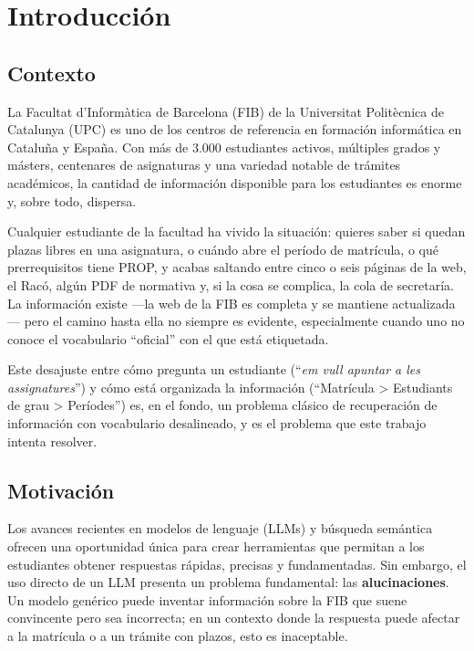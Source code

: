 \documentclass[12pt, a4paper, twoside]{report}
\begin{document}
\cleardoublepage
{}

\chapter{Introducci\'on}
\label{ch:introduccion}

\section{Contexto}

La Facultat d'Inform\`atica de Barcelona (FIB) de la Universitat Polit\`ecnica de Catalunya (UPC) es uno de los centros de referencia en formaci\'on inform\'atica en Catalu\~na y Espa\~na. Con m\'as de 3.000 estudiantes activos, m\'ultiples grados y m\'asters, centenares de asignaturas y una variedad notable de tr\'amites acad\'emicos, la cantidad de informaci\'on disponible para los estudiantes es enorme y, sobre todo, dispersa.

Cualquier estudiante de la facultad ha vivido la situaci\'on: quieres saber si quedan plazas libres en una asignatura, o cu\'ando abre el per\'iodo de matr\'icula, o qu\'e prerrequisitos tiene PROP, y acabas saltando entre cinco o seis p\'aginas de la web, el Rac\'o, alg\'un PDF de normativa y, si la cosa se complica, la cola de secretar\'ia. La informaci\'on existe ---la web de la FIB es completa y se mantiene actualizada--- pero el camino hasta ella no siempre es evidente, especialmente cuando uno no conoce el vocabulario ``oficial'' con el que est\'a etiquetada.

Este desajuste entre c\'omo pregunta un estudiante (``\textit{em vull apuntar a les assignatures}'') y c\'omo est\'a organizada la informaci\'on (``Matr\'icula > Estudiants de grau > Per\'iodes'') es, en el fondo, un problema cl\'asico de recuperaci\'on de informaci\'on con vocabulario desalineado, y es el problema que este trabajo intenta resolver.

\section{Motivaci\'on}

Los avances recientes en modelos de lenguaje (LLMs) y b\'usqueda sem\'antica ofrecen una oportunidad \'unica para crear herramientas que permitan a los estudiantes obtener respuestas r\'apidas, precisas y fundamentadas. Sin embargo, el uso directo de un LLM presenta un problema fundamental: las \textbf{alucinaciones}. Un modelo gen\'erico puede inventar informaci\'on sobre la FIB que suene convincente pero sea incorrecta; en un contexto donde la respuesta puede afectar a la matr\'icula o a un tr\'amite con plazos, esto es inaceptable.
\end{document}
